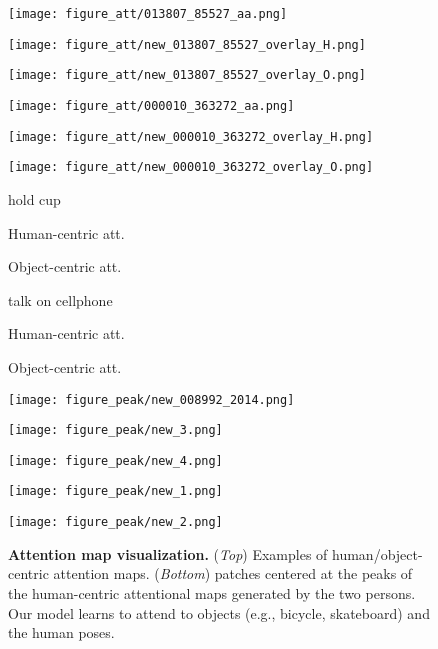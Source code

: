 \documentclass{bmvc2k}
\newlength\figmargin
\newlength\figbmargin
\newcommand{\mpage}[2]
{
\begin{minipage}{#1\linewidth}\centering
#2
\end{minipage}
}
\begin{document}
\begin{figure*}[t]
\centering
\footnotesize


\mpage{0.153}{\texttt{[image: figure\_att/013807\_85527\_aa.png]}}\mpage{0.153}{\texttt{[image: figure\_att/new\_013807\_85527\_overlay\_H.png]}}\mpage{0.153}{\texttt{[image: figure\_att/new\_013807\_85527\_overlay\_O.png]}}
\hfill
\mpage{0.153}{\texttt{[image: figure\_att/000010\_363272\_aa.png]}}\mpage{0.153}{\texttt{[image: figure\_att/new\_000010\_363272\_overlay\_H.png]}}\mpage{0.153}{\texttt{[image: figure\_att/new\_000010\_363272\_overlay\_O.png]}} 

\mpage{0.153}{\scriptsize hold cup}\mpage{0.153}{\scriptsize Human-centric att.}\mpage{0.153}{\scriptsize Object-centric att.} 
\hfill
\mpage{0.153}{\scriptsize talk on cellphone}
\mpage{0.153}{\scriptsize Human-centric att.}\mpage{0.153}{\scriptsize Object-centric att.}

\vspace{1mm}

\mpage{0.22}{\texttt{[image: figure\_peak/new\_008992\_2014.png]}}
\hfill
\mpage{0.15}{\texttt{[image: figure\_peak/new\_3.png]}}
\mpage{0.15}{\texttt{[image: figure\_peak/new\_4.png]}}
\hfill
\mpage{0.15}{\texttt{[image: figure\_peak/new\_1.png]}}
\mpage{0.15}{\texttt{[image: figure\_peak/new\_2.png]}}



































\vspace{\figmargin}
\caption{\textbf{Attention map visualization.} (\emph{Top}) Examples of human/object-centric attention maps. (\emph{Bottom})  patches centered at the peaks of the human-centric attentional maps generated by the two persons. Our model learns to attend to objects (e.g., bicycle, skateboard) and the human poses.
}
\vspace{\figbmargin}
\vspace{\figbmargin}
\label{fig:att_HO}
\end{figure*} 
\end{document}
